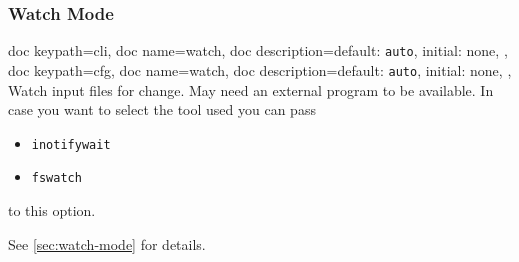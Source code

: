\documentclass[a4paper, 11pt]{scrartcl}
\begin{document}
\subsubsection{Watch Mode}
\begin{docKeys}[
		doc parameter={=\meta{watch}},
	]{
		{
			doc keypath=cli,
			doc name=watch,
			doc description={default: \texttt{auto}, initial: none},
		},
		{
			doc keypath=cfg,
			doc name=watch,
			doc description={default: \texttt{auto}, initial: none},
		},
	}
	Watch input files for change.
	May need an external program to be available.
	In case you want to select the tool used you can pass
	\begin{multicols}{2}
		\begin{itemize}
			\item \texttt{inotifywait}
			\item \texttt{fswatch}
		\end{itemize}
	\end{multicols}
	to this option.

	See \cref{sec:watch-mode} for details.
\end{docKeys}
\end{document}
